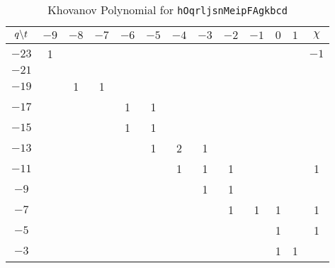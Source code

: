 \documentclass{article}
\theoremstyle{plain}
\begin{document}
        \begin{table}
            \centering
            \begin{tabular}{| c | c | c | c | c | c | c | c | c | c | c | c | c |}
                \hline
                $q\symbol{92}t$&$-9$&$-8$&$-7$&$-6$&$-5$&$-4$&$-3$&$-2$&$-1$&$0$&$1$&$\chi$\\
                \hline
                $-23$&1&&&&&&&&&&&$-1$\\
                \hline
                $-21$&&&&&&&&&&&&\\
                \hline
                $-19$&&1&1&&&&&&&&&\\
                \hline
                $-17$&&&&1&1&&&&&&&\\
                \hline
                $-15$&&&&1&1&&&&&&&\\
                \hline
                $-13$&&&&&1&2&1&&&&&\\
                \hline
                $-11$&&&&&&1&1&1&&&&1\\
                \hline
                $-9$&&&&&&&1&1&&&&\\
                \hline
                $-7$&&&&&&&&1&1&1&&1\\
                \hline
                $-5$&&&&&&&&&&1&&1\\
                \hline
                $-3$&&&&&&&&&&1&1&\\
                \hline
            \end{tabular}
            \caption{Khovanov Polynomial for \texttt{hOqrljsnMeipFAgkbcd}}
        \end{table}
    \clearpage
\end{document}
